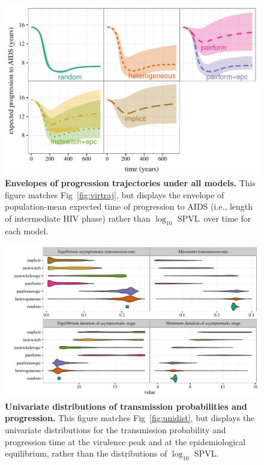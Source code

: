 \documentclass[10pt,letterpaper]{article}
\renewcommand{\figurename}{Fig}
\newcommand{\Lspvl}{$\log_{10}$ SPVL}
\begin{document}
\begin{figure}[!ht]
\includegraphics[width=\textwidth]{../figures/fig_S2_2.pdf}
\caption{{\bf Envelopes of progression trajectories under all models.}
This figure matches \figurename~\ref{fig:virtraj}, but displays the
envelope of population-mean expected time of progression to AIDS (i.e., length of
intermediate HIV phase) rather than \Lspvl\ over time
for each model.
}
\label{fig:durtraj}
\end{figure}

\begin{figure}[!ht]
  \includegraphics[width=\textwidth]{../figures/fig_S2_3.pdf}
\caption{{\bf Univariate distributions of transmission probabilities and progression.}
This figure matches \figurename~\ref{fig:unidist}, but displays the
univariate distributions for the transmission probability and 
progression time at the virulence
peak and at the epidemiological equilibrium,
rather than the distributions of \Lspvl.
}
\label{fig:tranprogsum}
\end{figure}
\end{document}
